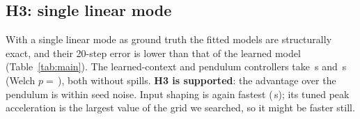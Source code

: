 \subsection{H3: single linear mode}
With a single linear mode as ground truth the fitted models are structurally exact, and their 20-step error is lower than that of the learned model (Table~\ref{tab:main}). The learned-context and pendulum controllers take \,s and \,s (Welch $p=\,$), both without spills. \textbf{H3 is supported}: the advantage over the pendulum is within seed noise. Input shaping is again fastest (\,s); its tuned peak acceleration is the largest value of the grid we searched, so it might be faster still.
